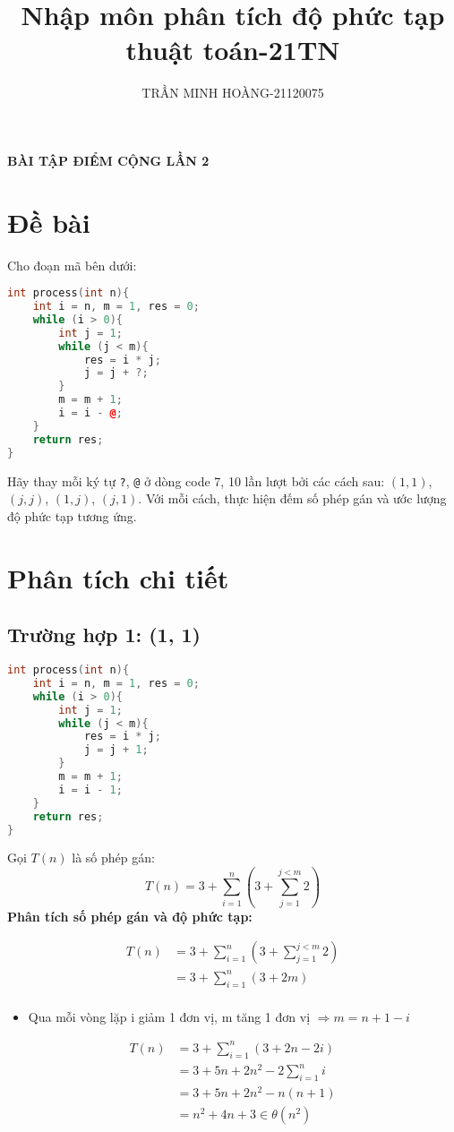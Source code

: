 \documentclass[12pt,a4paper]{article}
\title{\LARGE{\textbf{Nhập môn phân tích độ phức tạp thuật toán-21TN}}}
\author{TRẦN MINH HOÀNG-21120075}
\date{} %
\begin{document}
\maketitle
\begin{center}
    \textbf{BÀI TẬP ĐIỂM CỘNG LẦN 2}
\end{center}
\author{}
\date{}
\maketitle

\section*{Đề bài}

Cho đoạn mã bên dưới:

\begin{lstlisting}[language=C++]
int process(int n){
    int i = n, m = 1, res = 0;
    while (i > 0){
        int j = 1;
        while (j < m){
            res = i * j;
            j = j + ?;
        }
        m = m + 1;
        i = i - @;
    }
    return res;
}
\end{lstlisting}

Hãy thay mỗi ký tự \texttt{?}, \texttt{@} ở dòng code 7, 10 lần lượt bởi các cách sau: $(1,1)$, $(j,j)$, $(1,j)$, $(j,1)$. Với mỗi cách, thực hiện đếm số phép gán và ước lượng độ phức tạp tương ứng.

\section*{Phân tích chi tiết}

\subsection*{Trường hợp 1: (1, 1)}
\begin{lstlisting}[language=C++]
int process(int n){
    int i = n, m = 1, res = 0;
    while (i > 0){
        int j = 1;
        while (j < m){
            res = i * j;
            j = j + 1;
        }
        m = m + 1;
        i = i - 1;
    }
    return res;
}
\end{lstlisting}
Gọi $T(n) $ là số phép gán:
\[
    T(n)=3+\sum_{i = 1}^{n}(3+\sum_{j=1}^{j<m}2)
\]
\textbf{Phân tích số phép gán và độ phức tạp:}

\begin{align*}
    T(n)&=3+\sum_{i = 1}^{n}(3+\sum_{j=1}^{j<m}2)\\
    &=3+\sum_{i = 1}^{n}(3+2m)\\
\end{align*}
\begin{itemize}
    \item Qua mỗi vòng lặp i giảm 1 đơn vị, m tăng 1 đơn vị $\Rightarrow m=n+1-i$
\end{itemize}
\begin{align*}
    T(n)&=3+\sum_{i = 1}^{n}(3+2n-2i)\\
    &=3+5n+2n^2-2\sum_{i=1}^{n}i\\
    &=3+5n+2n^2-n(n+1)\\
    &=n^2+4n+3 \in \theta(n^2)
\end{align*}
\end{document}
